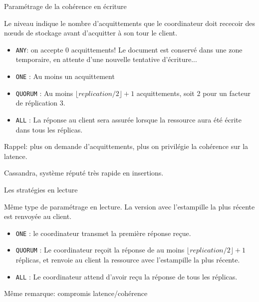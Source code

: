 \begin{frame}[fragile]{Paramétrage de la cohérence en écriture}

Le niveau indique le nombre d'acquittements que le coordinateur doit rececoir des nœuds de stockage avant d'acquitter
à son tour le client.

\begin{itemize}
   \item \texttt{ANY}:  on accepte 0 acquittements! Le document est conservé  dans une zone temporaire, en attente d'une nouvelle tentative d'écriture...

    \item \texttt{ONE} : Au moins un acquittement

    \item \texttt{QUORUM} : Au moins $\lfloor replication/2 \rfloor +1$ acquittements, soit 2 pour un facteur de réplication 3.
    
    \item \texttt{ALL} : La réponse au client sera assurée lorsque la ressource aura été écrite dans tous les réplicas. 
\end{itemize}

\vfill

Rappel: plus on demande d'acquittements, plus on privilégie la cohérence sur la latence.

\vfill

Cassandra, système réputé très rapide en insertions.

\end{frame}

 
\begin{frame}[fragile]{Les stratégies en lecture}

Même type de paramétrage en lecture. La version avec l'estampille la plus récente est renvoyée au client.

\begin{itemize}
    \item \texttt{ONE} : le coordinateur transmet la première réponse reçue.

    \item \texttt{QUORUM} : Le coordinateur reçoit la réponse de au moins $\lfloor replication/2 \rfloor +1$  
       réplicas, et renvoie au client la ressource avec l'estampille la plus récente.
    
    \item \texttt{ALL} : Le coordinateur attend d'avoir reçu la réponse  de tous les réplicas. 
\end{itemize}

\vfill

Même remarque: compromis latence/cohérence
\end{frame}
 

